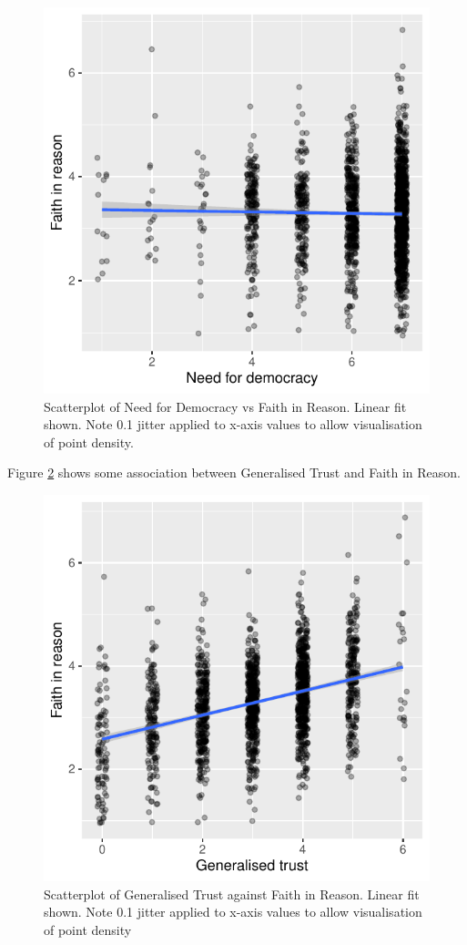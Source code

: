 \documentclass[
  ,jou,floatsintext]{apa6}
\begin{document}
\begin{figure}

{\centering \includegraphics[width=0.75\linewidth]{faithinreason_files/figure-latex/democract-1} 

}

\caption{Scatterplot of Need for Democracy vs Faith in Reason. Linear fit shown. Note 0.1 jitter applied to x-axis values to allow visualisation of point density.}\label{fig:democract}
\end{figure}

Figure \ref{fig:generalisetrust} shows some association between Generalised Trust and Faith in Reason.

\begin{figure}

{\centering \includegraphics[width=0.75\linewidth]{faithinreason_files/figure-latex/generalisetrust-1} 

}

\caption{Scatterplot of Generalised Trust against Faith in Reason. Linear fit shown. Note 0.1 jitter applied to x-axis values to allow visualisation of point density}\label{fig:generalisetrust}
\end{figure}
\end{document}

